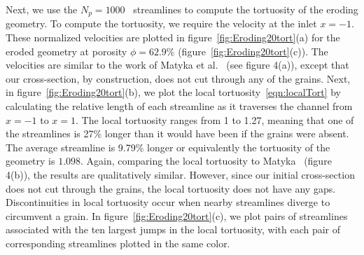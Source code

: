 \documentclass{jfm}
\begin{document}
Next, we use the $N_p = 1000$~\citep{bel-sal-rin1992} streamlines to
compute the tortuosity of the eroding geometry.  To compute the
tortuosity, we require the velocity at the inlet $x=-1$.  These
normalized velocities are plotted in figure~\ref{fig:Eroding20tort}(a)
for the eroded geometry at porosity $\phi = 62.9\%$
(figure~\ref{fig:Eroding20tort}(c)).  The velocities are similar to the
work of Matyka et al.~\citep{mat-kha-koz2008} (see figure 4(a)), except
that our cross-section, by construction, does not cut through any of the
grains.  Next, in figure~\ref{fig:Eroding20tort}(b), we plot the local
tortuosity~\eqref{eqn:localTort} by calculating the relative length of
each streamline as it traverses the channel from $x=-1$ to $x=1$.  The
local tortuosity ranges from 1 to 1.27, meaning that one of the
streamlines is 27\% longer than it would have been if the grains were
absent.  The average streamline is 9.79\% longer or equivalently the
tortuosity of the geometry is $1.098$.  Again, comparing the local
tortuosity to Matyka~\citep{mat-kha-koz2008} (figure 4(b)), the results
are qualitatively similar. However, since our initial cross-section does
not cut through the grains, the local tortuosity does not have any gaps.
Discontinuities in local tortuosity occur when nearby streamlines
diverge to circumvent a grain.  In figure~\ref{fig:Eroding20tort}(c), we
plot pairs of streamlines associated with the ten largest jumps in the
local tortuosity, with each pair of corresponding streamlines plotted in
the same color.
\end{document}
